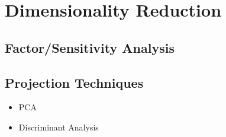 \section{Dimensionality Reduction}

\subsection{Factor/Sensitivity Analysis}

\subsection{Projection Techniques}

\begin{itemize}
\item PCA~\cite{Jolliffe2005}
\item Discriminant Analysis
\end{itemize}

